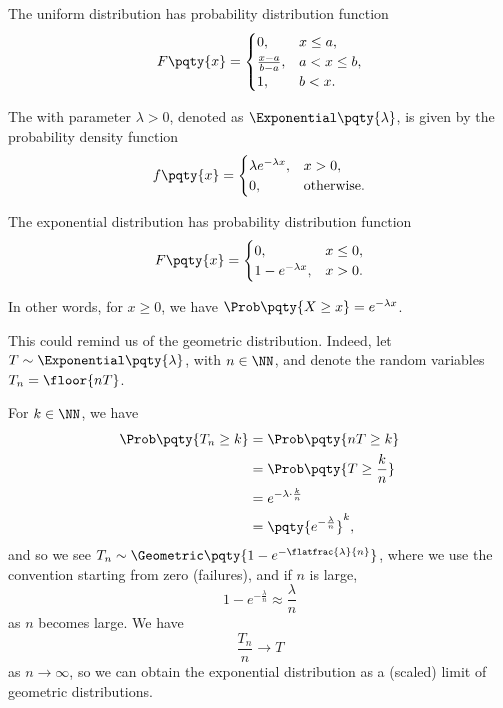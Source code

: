 \begin{proposition}
    \label{prop:cdf-uniform}%
    The uniform distribution has probability distribution function
    \[
        F\pqty{x} = \begin{cases}
            0, & x \leq a, \\
            \frac{x - a}{b - a}, & a < x \leq b, \\
            1, & b < x.
        \end{cases}
    \]
\end{proposition}

\begin{definition}
    \label{def:exponential-distribution}%
    The  with parameter \(\lambda > 0\), denoted as \(\Exponential\pqty{\lambda}\), is given by the probability density function
    \[
        f\pqty{x} = \begin{cases}
            \lambda e^{-\lambda x}, & x > 0, \\
            0, & \text{otherwise}.
        \end{cases}
    \]
\end{definition}

\begin{proposition}
    \label{prop:cdf-exponential}%
    The exponential distribution has probability distribution function
    \[
        F\pqty{x} = \begin{cases}
            0, & x \leq 0, \\
            1-  e^{-\lambda x}, & x > 0.
        \end{cases}
    \]

    In other words, for \(x \geq 0\), we have \(\Prob\pqty{X \geq x} = e^{-\lambda x}\).
\end{proposition}

This could remind us of the geometric distribution. Indeed, let \(T \sim \Exponential \pqty{\lambda}\), with \(n \in \NN\), and denote the random variables \(T_n = \floor{nT}\).

For \(k \in \NN\), we have
\begin{align*}
    \Prob\pqty{T_n \geq k} &= \Prob\pqty{nT \geq k} \\
    &= \Prob\pqty{T \geq \frac{k}{n}} \\
    &= e^{- \lambda \cdot \frac{k}{n}} \\
    &= \pqty{e^{-{\frac{\lambda}{n}}}}^{k},
\end{align*}
and so we see \(T_n \sim \Geometric\pqty{1 - e^{- \flatfrac{\lambda}{n}}}\), where we use the convention starting from zero (failures), and if \(n\) is large,
\[
    1 - e^{- \frac{\lambda}{n}} \approx \frac{\lambda}{n}
\]
as \(n\) becomes large. We have
\[
    \frac{T_n}{n} \to T
\]
as \(n \to \infty\), so we can obtain the exponential distribution as a (scaled) limit of geometric distributions.

